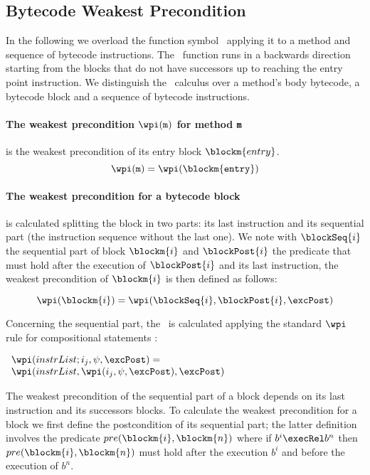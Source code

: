

\subsection{Bytecode Weakest Precondition}\label{wpGraph}

In the following we overload the function symbol \wpi \ applying it to a method and sequence of bytecode instructions.
The \wpi \ function runs in a backwards direction starting from the blocks that do not have successors up to reaching the entry point
 instruction. We distinguish the \wpi \ calculus over a method's body bytecode, a bytecode block and a sequence of bytecode instructions.

\paragraph{The weakest precondition $\wpi(\tt{m})$ for method \texttt{m}} is the weakest precondition of its entry block $\blockm{entry}$. 
 $$\wpi(\tt{m}) = \wpi(\blockm{entry})$$

\paragraph{The weakest precondition for a bytecode block} is calculated splitting the block in two parts: its last instruction and its sequential part (the instruction sequence without the last one). We note with $\blockSeq{i}$ the sequential part of block $\blockm{i}$ and $\blockPost{i}$ the predicate that must hold after the execution of $\blockPost{i}$ and its last instruction, the weakest precondition of $\blockm{i}$ is then defined as follows:

$$ \wpi(\blockm{i}) = \wpi( \blockSeq{i}, \blockPost{i}, \excPost ) $$

Concerning the sequential part, the \wpi \ is calculated applying the standard $\wpi$ rule for compositional statements :
\begin{center}
$ \begin{array}{l} \wpi( instrList;i_{j}, \psi,\excPost ) = \\ \wpi(instrList, \wpi(i_{j}, \psi,\excPost ),\excPost ) \end{array} $
\end{center}
The weakest precondition of the sequential part of a block depends on its last instruction and its successors blocks. 
To calculate the weakest precondition for a block we first define the postcondition of its sequential part; the latter definition involves
the predicate  $pre(\blockm{i}, \blockm{n}) $ where if $b^i \execRel b^n$ then $pre(\blockm{i}, \blockm{n})$ must hold after the execution $b^i$
and before the execution of $b^n$. 


